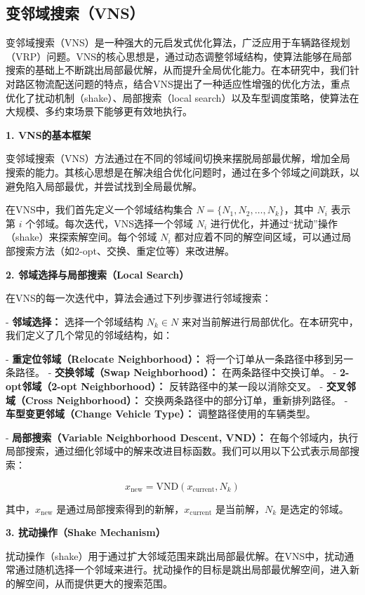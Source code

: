 \documentclass[12pt,a4paper,twoside]{ctexbook}
\begin{document}
\subsection{变邻域搜索（VNS）}

变邻域搜索（VNS）是一种强大的元启发式优化算法，广泛应用于车辆路径规划（VRP）问题。VNS的核心思想是，通过动态调整邻域结构，使算法能够在局部搜索的基础上不断跳出局部最优解，从而提升全局优化能力。在本研究中，我们针对路区物流配送问题的特点，结合VNS提出了一种适应性增强的优化方法，重点优化了扰动机制（shake）、局部搜索（local search）以及车型调度策略，使算法在大规模、多约束场景下能够更有效地执行。

\textbf{1. VNS的基本框架}

变邻域搜索（VNS）方法通过在不同的邻域间切换来摆脱局部最优解，增加全局搜索的能力。其核心思想是在解决组合优化问题时，通过在多个邻域之间跳跃，以避免陷入局部最优，并尝试找到全局最优解。

在VNS中，我们首先定义一个邻域结构集合 $N = \{N_1, N_2, \dots, N_k\}$，其中 $N_i$ 表示第 $i$ 个邻域。每次迭代，VNS选择一个邻域 $N_i$ 进行优化，并通过“扰动”操作（shake）来探索解空间。每个邻域 $N_i$ 都对应着不同的解空间区域，可以通过局部搜索方法（如2-opt、交换、重定位等）来改进解。

\textbf{2. 邻域选择与局部搜索（Local Search）}

在VNS的每一次迭代中，算法会通过下列步骤进行邻域搜索：

- \textbf{邻域选择：} 选择一个邻域结构 $N_k \in N$ 来对当前解进行局部优化。在本研究中，我们定义了几个常见的邻域结构，如：

  - \textbf{重定位邻域（Relocate Neighborhood）：} 将一个订单从一条路径中移到另一条路径。
  - \textbf{交换邻域（Swap Neighborhood）：} 在两条路径中交换订单。
  - \textbf{2-opt邻域（2-opt Neighborhood）：} 反转路径中的某一段以消除交叉。
  - \textbf{交叉邻域（Cross Neighborhood）：} 交换两条路径中的部分订单，重新排列路径。
  - \textbf{车型变更邻域（Change Vehicle Type）：} 调整路径使用的车辆类型。

- \textbf{局部搜索（Variable Neighborhood Descent, VND）：} 在每个邻域内，执行局部搜索，通过细化邻域中的解来改进目标函数。我们可以用以下公式表示局部搜索：

  \[
  x_{\text{new}} = \text{VND}(x_{\text{current}}, N_k)
  \]

  其中，$x_{\text{new}}$ 是通过局部搜索得到的新解，$x_{\text{current}}$ 是当前解，$N_k$ 是选定的邻域。

\textbf{3. 扰动操作（Shake Mechanism）}

扰动操作（shake）用于通过扩大邻域范围来跳出局部最优解。在VNS中，扰动通常通过随机选择一个邻域来进行。扰动操作的目标是跳出局部最优解空间，进入新的解空间，从而提供更大的搜索范围。
\end{document}
